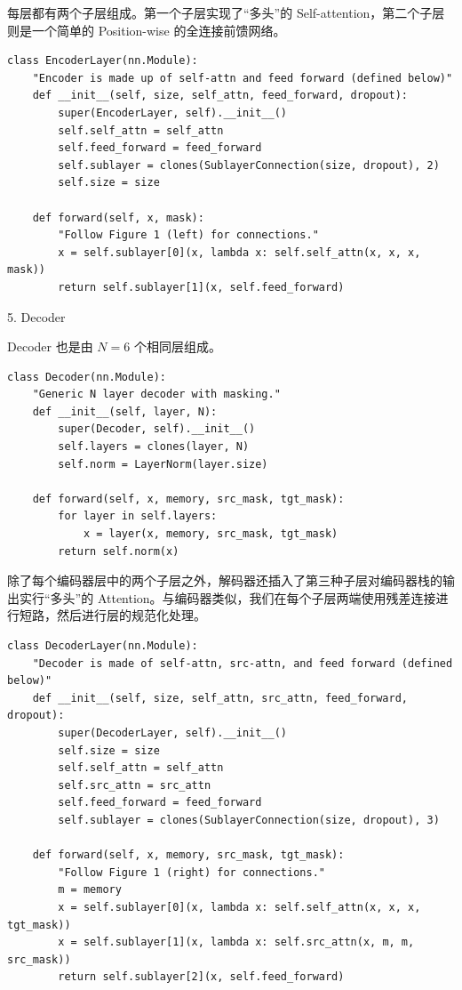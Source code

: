 每层都有两个子层组成。第一个子层实现了“多头”的 Self-attention，第二个子层则是一个简单的 Position-wise 的全连接前馈网络。

\begin{Verbatim}
class EncoderLayer(nn.Module):
    "Encoder is made up of self-attn and feed forward (defined below)"
    def __init__(self, size, self_attn, feed_forward, dropout):
        super(EncoderLayer, self).__init__()
        self.self_attn = self_attn
        self.feed_forward = feed_forward
        self.sublayer = clones(SublayerConnection(size, dropout), 2)
        self.size = size

    def forward(self, x, mask):
        "Follow Figure 1 (left) for connections."
        x = self.sublayer[0](x, lambda x: self.self_attn(x, x, x, mask))
        return self.sublayer[1](x, self.feed_forward)
\end{Verbatim}

5. Decoder

Decoder 也是由 $N = 6$ 个相同层组成。

\begin{Verbatim}
class Decoder(nn.Module):
    "Generic N layer decoder with masking."
    def __init__(self, layer, N):
        super(Decoder, self).__init__()
        self.layers = clones(layer, N)
        self.norm = LayerNorm(layer.size)
        
    def forward(self, x, memory, src_mask, tgt_mask):
        for layer in self.layers:
            x = layer(x, memory, src_mask, tgt_mask)
        return self.norm(x)
\end{Verbatim}

除了每个编码器层中的两个子层之外，解码器还插入了第三种子层对编码器栈的输出实行“多头”的 Attention。与编码器类似，我们在每个子层两端使用残差连接进行短路，然后进行层的规范化处理。

\begin{Verbatim}
class DecoderLayer(nn.Module):
    "Decoder is made of self-attn, src-attn, and feed forward (defined below)"
    def __init__(self, size, self_attn, src_attn, feed_forward, dropout):
        super(DecoderLayer, self).__init__()
        self.size = size
        self.self_attn = self_attn
        self.src_attn = src_attn
        self.feed_forward = feed_forward
        self.sublayer = clones(SublayerConnection(size, dropout), 3)
 
    def forward(self, x, memory, src_mask, tgt_mask):
        "Follow Figure 1 (right) for connections."
        m = memory
        x = self.sublayer[0](x, lambda x: self.self_attn(x, x, x, tgt_mask))
        x = self.sublayer[1](x, lambda x: self.src_attn(x, m, m, src_mask))
        return self.sublayer[2](x, self.feed_forward)
\end{Verbatim}

